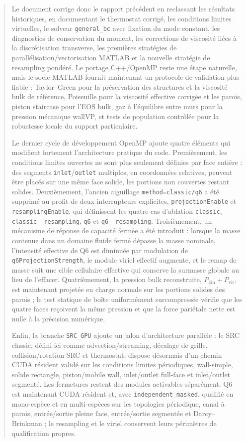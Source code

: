 \documentclass[11pt,a4paper]{article}
\begin{document}
\begin{abstract}
Le document corrige donc le rapport précédent en reclassant les résultats historiques, en documentant le thermostat corrigé, les conditions limites virtuelles, le solveur \texttt{general\_bc} avec fixation du mode constant, les diagnostics de conservation du moment, les corrections de viscosité liées à la discrétisation transverse, les premières stratégies de parallélisation/vectorisation MATLAB et la nouvelle stratégie de resampling pondéré. Le portage C++/OpenMP reste une étape naturelle, mais le socle MATLAB fournit maintenant un protocole de validation plus fiable : Taylor--Green pour la préservation des structures et la viscosité bulk de référence, Poiseuille pour la viscosité effective corrigée et les parois, piston staircase pour l'EOS bulk, gaz à l'équilibre entre murs pour la pression mécanique wallVP, et tests de population contrôlée pour la robustesse locale du support particulaire.


Le dernier cycle de développement OpenMP ajoute quatre éléments qui modifient fortement l'architecture pratique du code. Premièrement, les conditions limites ouvertes ne sont plus seulement définies par face entière : des segments \texttt{inlet}/\texttt{outlet} multiples, en coordonnées relatives, peuvent être placés sur une même face solide, les portions non couvertes restant solides. Deuxièmement, l'ancien aiguillage \texttt{method=classic/q6} a été supprimé au profit de deux interrupteurs explicites, \texttt{projectionEnable} et \texttt{resamplingEnable}, qui définissent les quatre cas d'ablation \texttt{classic}, \texttt{classic\_ resampling}, \texttt{q6} et \texttt{q6\_ resampling}. Troisièmement, un mécanisme de réponse de capacité fermée a été introduit : lorsque la masse contenue dans un domaine fluide fermé dépasse la masse nominale, l'intensité effective de Q6 est diminuée par modulation de \texttt{q6ProjectionStrength}, le module viriel effectif augmente, et le remap de masse suit une cible cellulaire effective qui conserve la surmasse globale au lieu de l'effacer. Quatrièmement, la pression bulk reconstruite, $P_{\mathrm{kin}}+P_{\mathrm{vir}}$, est maintenant projetée en charge normale sur les portions solides des parois ; le test statique de boîte uniformément surcompressée vérifie que les quatre faces reçoivent la même pression et que la force pariétale nette est nulle à la précision numérique.

Enfin, la branche \texttt{SRC\_GPU} ajoute un jalon d'architecture parallèle : le SRC classic, défini ici comme advection/streaming, décalage de grille, collision/rotation SRC et thermostat, dispose désormais d'un chemin CUDA résident validé sur les conditions limites périodiques, wall-simple, solide rectangle, piston/mobile wall, inlet/outlet full-face et inlet/outlet segmenté. Les fermetures restent des modules activables séparément. Q6 est maintenant CUDA résident et, avec \texttt{independent\_masked}, qualifié en mono-espèce et en multi-espèces sur les topologies périodique, canal à parois, entrée/sortie pleine face, entrée/sortie segmentée et Darcy--Brinkman ; le resampling et le viriel conservent leurs périmètres de qualification propres.




\end{abstract}
\end{document}
